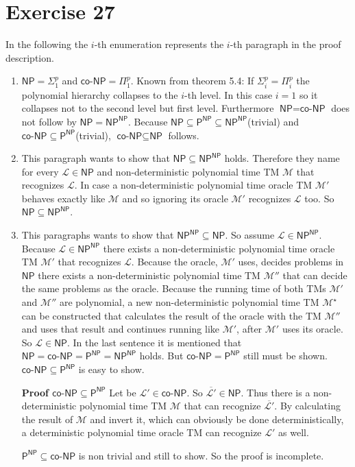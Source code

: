 \documentclass[10pt]{article}
\newcommand{\cP}{\textsf{P}}
\newcommand{\NP}{\textsf{NP}}
\newcommand{\coNP}{\textsf{co-NP}}
\newcommand{\Ll}{\mathcal{L}}
\newcommand{\Mm}{\mathcal{M}}
\begin{document}
\section*{Exercise 27}
In the following the $i$-th enumeration represents the $i$-th
paragraph in the proof description.
  \begin{enumerate}
    \item $\NP=\Sigma_{1}^{p}$ and $\coNP=\Pi_{1}^{p}$. Known from theorem 5.4:
    If $\Sigma_{i}^{p}=\Pi_{i}^{p}$ the polynomial hierarchy collapses to the
    $i$-th level. In this case $i=1$ so it collapses not to the second level but
    first level. Furthermore $\NP = \coNP$ does not follow by $\NP=\NP^{\NP}$.
    Because $\NP \subseteq \cP^{\NP} \subseteq \NP^{\NP}$(trivial) and $\coNP\subseteq
    \cP^{\NP}$(trivial), $\coNP \subseteq \NP$ follows.

    \item This paragraph wants to show that $\NP \subseteq \NP^{\NP}$ holds.
    Therefore they name for every $\Ll \in \NP$ and non-deterministic polynomial
    time TM $\Mm$ that recognizes $\Ll$. In case a non-deterministic polynomial
    time oracle TM $\Mm'$ behaves exactly like $\Mm$ and so ignoring its oracle
    $\Mm'$ recognizes $\Ll$ too. So $\NP \subseteq\NP^{\NP}$.

    \item This paragraphs wants to show that $\NP^{\NP}\subseteq \NP$. So assume
    $\Ll \in \NP^{\NP}$. Because $\Ll \in \NP^{\NP}$ there exists a
    non-deterministic polynomial time oracle TM $\Mm'$ that recognizes $\Ll$.
    Because the oracle, $\Mm'$ uses, decides problems in $\NP$ there exists a
    non-deterministic polynomial time TM $\Mm''$ that can decide the same
    problems as the oracle. Because the running time of both TMs $\Mm'$ and
    $\Mm''$ are polynomial, a new non-deterministic polynomial time TM
    $\Mm^\star$ can be constructed that calculates the result of the oracle with
    the TM $\Mm''$ and uses that result and continues running like $\Mm'$, after
    $\Mm'$ uses its oracle. So $\Ll \in \NP$. In the last sentence it is
    mentioned that $\NP = \coNP = \cP^{\NP} = \NP^{\NP}$ holds. But $\coNP
    =\cP^{\NP}$ still must be shown. $\coNP\subseteq \cP^{\NP}$ is easy to show.
    
    \textbf{Proof $\coNP \subseteq \cP^{\NP}$}
    Let be $\Ll'\in \coNP$. So $\overline{\Ll'}\in \NP$. Thus there is a
    non-deterministic polynomial time TM $\Mm$ that can recognize
    $\overline{\Ll'}$. By calculating the result of $\Mm$ and invert it, which
    can obviously be done deterministically, a deterministic polynomial time
    oracle TM can recognize $\Ll'$ as well. 

    $\cP^{\NP} \subseteq \coNP$ is non trivial and still to show. So the proof is
    incomplete.

  \end{enumerate}
\end{document}
